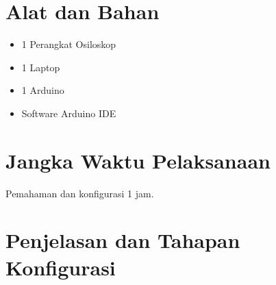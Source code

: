 \section{Alat dan Bahan}
\begin{itemize}[label=$\bullet$, itemsep=-1pt, leftmargin=*]
	\item 1 Perangkat Osiloskop
	\item 1 Laptop
	\item 1 Arduino
	\item Software Arduino IDE
\end{itemize}

\section{Jangka Waktu Pelaksanaan}
Pemahaman dan konfigurasi 1 jam.

\section{Penjelasan dan Tahapan Konfigurasi}

